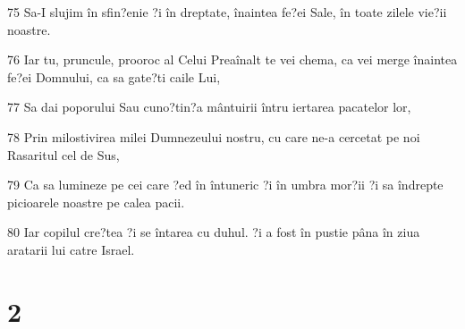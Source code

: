 \par 75 Sa-I slujim în sfin?enie ?i în dreptate, înaintea fe?ei Sale, în toate zilele vie?ii noastre.
\par 76 Iar tu, pruncule, prooroc al Celui Preaînalt te vei chema, ca vei merge înaintea fe?ei Domnului, ca sa gate?ti caile Lui,
\par 77 Sa dai poporului Sau cuno?tin?a mântuirii întru iertarea pacatelor lor,
\par 78 Prin milostivirea milei Dumnezeului nostru, cu care ne-a cercetat pe noi  Rasaritul cel de Sus,
\par 79 Ca sa lumineze pe cei care ?ed în întuneric ?i în umbra mor?ii ?i sa îndrepte picioarele noastre pe calea pacii.
\par 80 Iar copilul cre?tea ?i se întarea cu duhul. ?i a fost în pustie pâna în ziua aratarii lui catre Israel.

\chapter{2}

